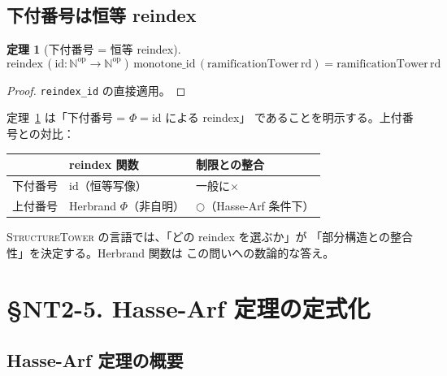 \documentclass[a4paper,11pt]{ltjsarticle}
\theoremstyle{definition}
\theoremstyle{plain}
\newtheorem{theorem}[definition]{定理}
\theoremstyle{remark}
\newcommand{\Phi}{\varPhi}
\begin{document}
\subsection{下付番号は恒等 reindex}

\begin{theorem}[下付番号 = 恒等 reindex]\label{thm:lower-is-id-reindex}
  \[
    \mathrm{reindex}\,(\mathrm{id}\colon \mathbb{N}^{\mathrm{op}} \to \mathbb{N}^{\mathrm{op}})\,
    \mathrm{monotone\_id}\,(\mathrm{ramificationTower}\,\mathrm{rd})
    = \mathrm{ramificationTower}\,\mathrm{rd}
  \]
\end{theorem}

\begin{proof}
  \texttt{reindex\_id} の直接適用。
\end{proof}

\begin{mathinsight}
定理~\ref{thm:lower-is-id-reindex} は「下付番号 = $\Phi = \mathrm{id}$ による reindex」
であることを明示する。上付番号との対比：

\begin{center}
\renewcommand{\arraystretch}{1.3}
\begin{tabular}{lll}
\toprule
 & \textbf{reindex 関数} & \textbf{制限との整合} \\
\midrule
下付番号 & $\mathrm{id}$（恒等写像） & 一般に$\times$ \\
上付番号 & Herbrand $\Phi$（非自明） & $\bigcirc$（Hasse-Arf 条件下） \\
\bottomrule
\end{tabular}
\end{center}

\textsc{StructureTower} の言語では、「どの reindex を選ぶか」が
「部分構造との整合性」を決定する。Herbrand 関数は
この問いへの数論的な答え。
\end{mathinsight}

\section{\S NT2-5. Hasse-Arf 定理の定式化}

\subsection{Hasse-Arf 定理の概要}
\end{document}

